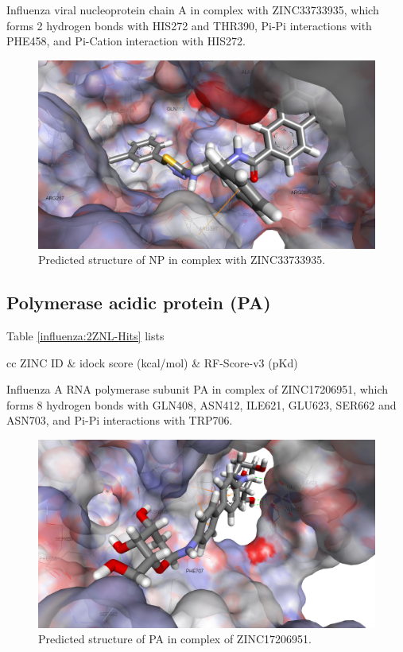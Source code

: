 Influenza viral nucleoprotein chain A in complex with ZINC33733935, which forms 2 hydrogen bonds with HIS272 and THR390, Pi-Pi interactions with PHE458, and Pi-Cation interaction with HIS272.

\begin{figure}
\centering
\includegraphics[width=\linewidth]{../influenza/2IQH-ZINC33733935.png}
\caption{Predicted structure of NP in complex with ZINC33733935.}
\label{influenza:2IQH-ZINC33733935}
\end{figure}

\subsection{Polymerase acidic protein (PA)}

Table \ref{influenza:2ZNL-Hits} lists

\begin{table}
\caption{Top ligands .}
\label{influenza:2ZNL-Hits}
\begin{tabular}{cc}
\hline
ZINC ID & idock score (kcal/mol) & RF-Score-v3 (pKd)\\
\hline
\hline
\end{tabular}
\end{table}

Influenza A RNA polymerase subunit PA in complex of ZINC17206951, which forms 8 hydrogen bonds with GLN408, ASN412, ILE621, GLU623, SER662 and ASN703, and Pi-Pi interactions with TRP706.

\begin{figure}
\centering
\includegraphics[width=\linewidth]{../influenza/2ZNL-ZINC17206951.png}
\caption{Predicted structure of PA in complex of ZINC17206951.}
\label{influenza:2ZNL-ZINC17206951}
\end{figure}

